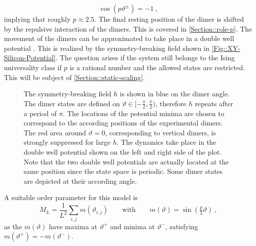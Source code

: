 	\begin{equation}
		\cos \left(p \vartheta^\pm\right) =	-1~,
	\end{equation}
	implying that roughly $ p \approx 2.5$. The final resting position of the dimer is shifted by the repulsive interaction of the dimers. This is covered in \autoref{Section::role-p}. The movement of the dimers can be approximated to take place in a double well potential \cite{dabrowski1992self}. This is realized by the symmetry-breaking field shown in \autoref{Fig::XY-Silicon-Potential}. The question arises if the system still belongs to the Ising universality class if $p$ is a rational number and the allowed states are restricted. This will be subject of \autoref{Section::static-scaling}. \\
	
	\begin{figure}
		\centering
		
		\caption{The symmetry-breaking field $h$ is shown in blue on the dimer angle. The dimer states are defined on $\vartheta \in [-\tfrac{\pi}{2}, \tfrac{\pi}{2})$, therefore $h$ repeats after a period of $\pi$. The locations of the potential minima are chosen to correspond to the according positions of the experimental dimers. The red area around $\vartheta =	0$, corresponding to vertical dimers, is strongly suppressed for large $h$. The dynamics take place in the double well potential shown on the left and right side of the plot. Note that the two double well potentials are actually located at the same position since the state space is periodic. Some dimer states are depicted at their according angle.}
		\label{Fig::XY-Silicon-Potential}
	\end{figure}
	A suitable order parameter for this model is
	\begin{equation} \label{Eq::Si-Order-Param}
		M_L =	\frac{1}{L^2} \sum_{i,j} m(\vartheta_{i, j}) \qquad \text{with} \qquad	m(\vartheta) =	\sin \left(\tfrac{p}{2} \vartheta\right) ~,
	\end{equation}
	as the $m(\vartheta)$ have maxima at $\vartheta^{+}$ and minima at $\vartheta^{-}$, satisfying $m(\vartheta^+) =	- m (\vartheta^-)$.
	
